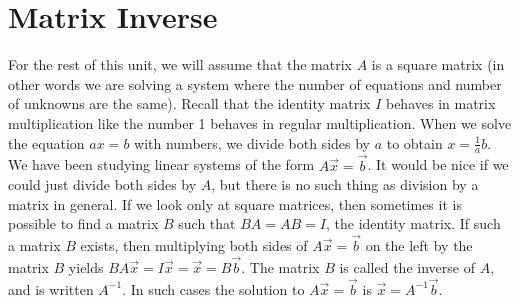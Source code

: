 \documentclass[10pt]{article}
\begin{document}
\section{Matrix Inverse}
For the rest of this unit, we will assume that the matrix $A$ is a square matrix (in other words we are solving a system where the number of equations and number of unknowns are the same). Recall that the identity matrix $I$ behaves in matrix multiplication like the number 1 behaves in regular multiplication.  When we solve the equation $ax=b$ with numbers, we divide both sides by $a$ to obtain $x=\frac{1}{a}b$.  We have been studying linear systems of the form {$A\vec x=\vec b$}. It would be nice if we could just divide both sides by {$A$}, but there is no such thing as division by a matrix in general. If we look only at square matrices, then sometimes it is possible to find a matrix {$B$} such that {$BA=AB=I$}, the identity matrix. If such a matrix {$B$} exists, then multiplying both sides of {$A\vec x = \vec b$} on the left by the matrix {$B$} yields {$BA\vec x = I\vec x = \vec x = B\vec b$}. The matrix {$B$} is called the inverse of {$A$}, and is written {$A^{-1}$}. In such cases the solution to {$A\vec x = \vec b$} is {$\vec x = A^{-1}\vec b$}.
\end{document}
